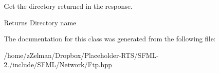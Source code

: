Get the directory returned in the response. 

\begin{DoxyReturn}{Returns}
Directory name 
\end{DoxyReturn}


The documentation for this class was generated from the following file\-:\begin{DoxyCompactItemize}
\item 
/home/z\-Zelman/\-Dropbox/\-Placeholder-\/\-R\-T\-S/\-S\-F\-M\-L-\/2./include/\-S\-F\-M\-L/\-Network/Ftp.\-hpp\end{DoxyCompactItemize}
